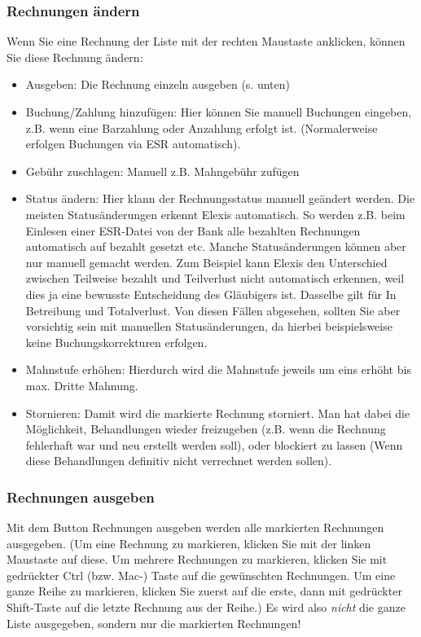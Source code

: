 \subsubsection{Rechnungen ändern}
Wenn Sie eine Rechnung der Liste mit der rechten Maustaste anklicken, können Sie diese Rechnung ändern:
\begin{itemize}
\item Ausgeben: Die Rechnung einzeln ausgeben (s. unten)
\item Buchung/Zahlung hinzufügen: Hier können Sie manuell Buchungen eingeben, z.B. wenn eine Barzahlung oder Anzahlung erfolgt ist. (Normalerweise erfolgen Buchungen via ESR automatisch).
\item Gebühr zuschlagen: Manuell z.B. Mahngebühr zufügen
\item Status ändern: Hier klann der Rechnungsstatus manuell geändert werden. Die meisten Statusänderungen erkennt Elexis automatisch. So werden z.B. beim Einlesen einer ESR-Datei von der Bank alle bezahlten Rechnungen automatisch auf \glqq bezahlt\grqq{} gesetzt etc. Manche Statusänderungen können aber nur manuell gemacht werden. Zum Beispiel kann Elexis den Unterschied zwischen \glqq Teilweise bezahlt\grqq{} und \glqq Teilverlust\grqq{} nicht automatisch erkennen, weil dies ja eine bewusste Entscheidung des Gläubigers ist. Dasselbe gilt für \glqq In Betreibung\grqq{} und \glqq Totalverlust\grqq{}.
    Von diesen Fällen abgesehen, sollten Sie aber vorsichtig sein mit manuellen Statusänderungen, da hierbei beispielsweise keine Buchungskorrekturen erfolgen.
\item Mahnstufe erhöhen: Hierdurch wird die Mahnstufe jeweils um eins erhöht bis max. Dritte Mahnung.
\item Stornieren: Damit wird die markierte Rechnung storniert. Man hat dabei die Möglichkeit, Behandlungen wieder freizugeben (z.B. wenn die Rechnung fehlerhaft war und neu erstellt werden soll), oder blockiert zu lassen (Wenn diese Behandlungen definitiv nicht verrechnet werden sollen).
\end{itemize}

\subsubsection{Rechnungen ausgeben}
Mit dem Button \glqq Rechnungen ausgeben\grqq{} werden alle markierten Rechnungen ausgegeben. (Um eine Rechnung zu markieren, klicken Sie mit der linken Maustaste auf diese. Um mehrere Rechnungen zu markieren, klicken Sie mit gedrückter Ctrl (bzw. Mac-) Taste auf die gewünschten Rechnungen. Um eine ganze Reihe zu markieren, klicken Sie zuerst auf die erste, dann mit gedrückter Shift-Taste auf die letzte Rechnung aus der Reihe.) Es wird also \textit{nicht} die ganze Liste ausgegeben, sondern nur die markierten Rechnungen!


